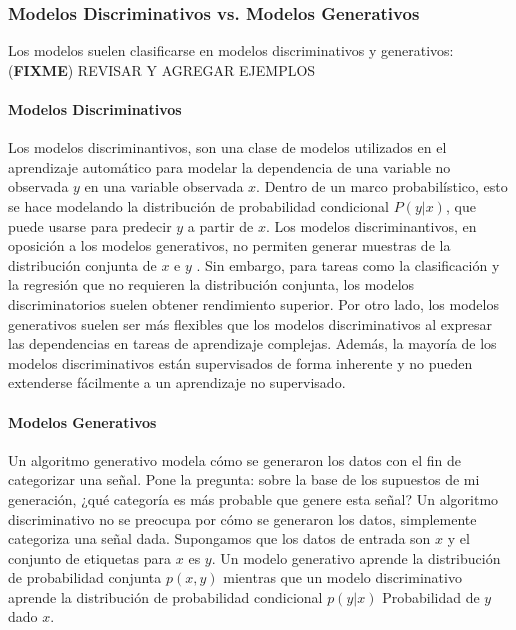 \documentclass[a4paper,11pt,spanish]{book}
\newcommand*{\FIXME}[1]{{(\textbf{FIXME}) {#1}}}
\begin{document}
      \subsubsection{Modelos Discriminativos vs. Modelos Generativos}
	Los modelos suelen clasificarse en modelos discriminativos y generativos:
	\FIXME{REVISAR Y AGREGAR EJEMPLOS}
	\paragraph{Modelos Discriminativos}
	  Los modelos discriminantivos, son una clase de modelos utilizados en el aprendizaje automático para modelar la dependencia de una variable no observada $y$  en una variable observada $x$.
	  Dentro de un marco probabilístico, esto se hace modelando la distribución de probabilidad condicional $P (y | x)$, que puede usarse para predecir $y$ a partir de  $x$.
	  Los modelos discriminantivos, en oposición a los modelos generativos, no permiten generar muestras de la distribución conjunta de $x$ e $y$ .
	  Sin embargo, para tareas como la clasificación y la regresión que no requieren la distribución conjunta, los modelos discriminatorios suelen obtener rendimiento superior.
	  Por otro lado, los modelos generativos suelen ser más flexibles que los modelos discriminativos al expresar las dependencias en tareas de aprendizaje complejas.
	  Además, la mayoría de los modelos discriminativos están supervisados ​​de forma inherente y no pueden extenderse fácilmente a un aprendizaje no supervisado.

	\paragraph{Modelos Generativos}
	  Un algoritmo generativo modela cómo se generaron los datos con el fin de categorizar una señal. Pone la pregunta: sobre la base de los supuestos de mi generación,
	  ¿qué categoría es más probable que genere esta señal? Un algoritmo discriminativo no se preocupa por cómo se generaron los datos, simplemente categoriza una señal dada.
	  Supongamos que los datos de entrada son $x$ y el conjunto de etiquetas para $x$ es $y$. Un modelo generativo aprende la distribución de probabilidad conjunta
	  $p (x, y)$  mientras que un modelo discriminativo aprende la distribución de probabilidad condicional  $p (y | x)$ Probabilidad de $y$ dado $x$.
\end{document}
